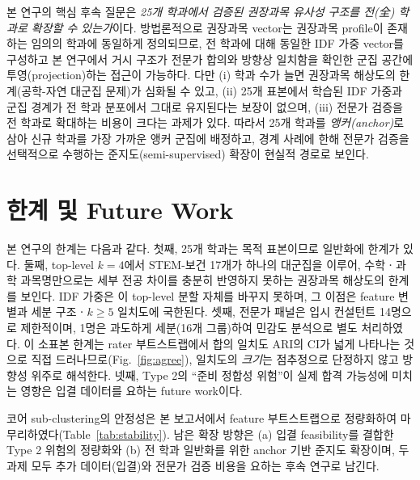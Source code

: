 \documentclass[conference]{IEEEtran}
\begin{document}
본 연구의 핵심 후속 질문은 \emph{25개 학과에서 검증된 권장과목 유사성 구조를 전(全) 학과로 확장할 수 있는가}이다.
방법론적으로 권장과목 vector는 권장과목 profile이 존재하는 임의의 학과에 동일하게 정의되므로, 전 학과에 대해 동일한 IDF 가중 vector를 구성하고 본 연구에서 거시 구조가 전문가 합의와 방향상 일치함을 확인한 군집 공간에 투영(projection)하는 접근이 가능하다.
다만 (i) 학과 수가 늘면 권장과목 해상도의 한계(공학-자연 대군집 문제)가 심화될 수 있고, (ii) 25개 표본에서 학습된 IDF 가중과 군집 경계가 전 학과 분포에서 그대로 유지된다는 보장이 없으며, (iii) 전문가 검증을 전 학과로 확대하는 비용이 크다는 과제가 있다.
따라서 25개 학과를 \emph{앵커(anchor)}로 삼아 신규 학과를 가장 가까운 앵커 군집에 배정하고, 경계 사례에 한해 전문가 검증을 선택적으로 수행하는 준지도(semi-supervised) 확장이 현실적 경로로 보인다.

\section{한계 및 Future Work}

본 연구의 한계는 다음과 같다.
첫째, 25개 학과는 목적 표본이므로 일반화에 한계가 있다.
둘째, top-level $k=4$에서 STEM-보건 17개가 하나의 대군집을 이루어, 수학ㆍ과학 과목명만으로는 세부 전공 차이를 충분히 반영하지 못하는 권장과목 해상도의 한계를 보인다. IDF 가중은 이 top-level 분할 자체를 바꾸지 못하며, 그 이점은 feature 변별과 세분 구조ㆍ$k\!\ge\!5$ 일치도에 국한된다.
셋째, 전문가 패널은 입시 컨설턴트 14명으로 제한적이며, 1명은 과도하게 세분(16개 그룹)하여 민감도 분석으로 별도 처리하였다. 이 소표본 한계는 rater 부트스트랩에서 합의 일치도 ARI의 CI가 넓게 나타나는 것으로 직접 드러나므로(Fig.~\ref{fig:agree}), 일치도의 \emph{크기}는 점추정으로 단정하지 않고 방향성 위주로 해석한다.
넷째, Type 2의 ``준비 정합성 위험''이 실제 합격 가능성에 미치는 영향은 입결 데이터를 요하는 future work이다.

코어 sub-clustering의 안정성은 본 보고서에서 feature 부트스트랩으로 정량화하여 마무리하였다(Table~\ref{tab:stability}). 남은 확장 방향은 (a) 입결 feasibility를 결합한 Type 2 위험의 정량화와 (b) 전 학과 일반화를 위한 anchor 기반 준지도 확장이며, 두 과제 모두 추가 데이터(입결)와 전문가 검증 비용을 요하는 후속 연구로 남긴다.
\end{document}
